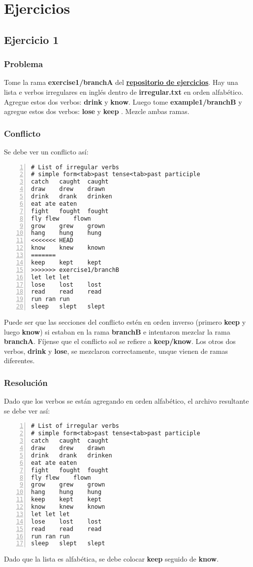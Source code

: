 
\chapter{Ejercicios}

\section{Ejercicio 1}
\label{exercise_01}
\subsection*{Problema}
Tome la rama {\bf exercise1/branchA } del \hyperref[exercises_repo]{\bf repositorio de ejercicios}. Hay una lista
e verbos irregulares en inglés dentro de {\bf irregular.txt} en orden alfabético. Agregue estos dos verbos: {\bf drink} y {\bf know}.
Luego tome {\bf example1/branchB } y agregue estos dos verbos: {\bf lose } y {\bf keep }. Mezcle ambas ramas.

\subsection*{Conflicto}
Se debe ver un conflicto así:
\begin{lstlisting}[style=console_style, numbers=left, caption={\bf Ejercicio 1} - conflicto]
# List of irregular verbs
# simple form<tab>past tense<tab>past participle
catch	caught	caught
draw	drew	drawn
drink	drank	drinken
eat	ate	eaten
fight	fought	fought
fly	flew	flown
grow	grew	grown
hang	hung	hung
<<<<<<< HEAD
know	knew	known
=======
keep	kept	kept
>>>>>>> exercise1/branchB
let	let	let
lose	lost	lost
read	read	read
run	ran	run
sleep	slept	slept
\end{lstlisting}

Puede ser que las secciones del conflicto estén en orden inverso (primero {\bf keep} y luego {\bf know}) si estaban en la rama
{\bf branchB} e intentaron mezclar la rama {\bf branchA}. Fíjense que el conflicto sol se refiere a {\bf keep/know}. Los otros dos verbos,
{\bf drink} y {\bf lose}, se mezclaron correctamente, unque vienen de ramas diferentes.

\subsection*{Resolución}
Dado que los verbos se están agregando en orden alfabético, el archivo resultante se debe ver así:
\begin{lstlisting}[style=console_style, numbers=left, caption={\bf Ejercicio 1} - Resolución]
# List of irregular verbs
# simple form<tab>past tense<tab>past participle
catch	caught	caught
draw	drew	drawn
drink	drank	drinken
eat	ate	eaten
fight	fought	fought
fly	flew	flown
grow	grew	grown
hang	hung	hung
keep	kept	kept
know	knew	known
let	let	let
lose	lost	lost
read	read	read
run	ran	run
sleep	slept	slept
\end{lstlisting}
Dado que la lista es alfabética, se debe colocar {\bf keep} seguido de {\bf know}.


